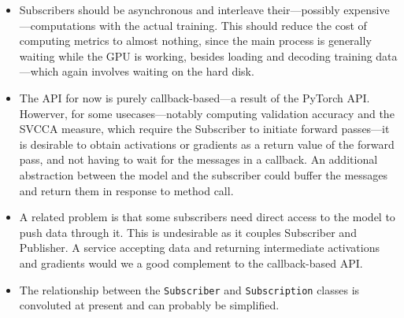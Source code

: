 \begin{itemize}
    \item Subscribers should be asynchronous and interleave their---possibly
        expensive---computations with the actual training. This should reduce
        the cost of computing metrics to almost nothing, since the main process
        is generally waiting while the GPU is working, besides loading and
        decoding training data---which again involves waiting on the hard disk.
    \item The API for now is purely callback-based---a result of the PyTorch
        API. Howerver, for some usecases---notably computing validation
        accuracy and the SVCCA measure, which require the Subscriber to initiate
        forward passes---it is desirable to obtain activations or gradients as
        a return value of the forward pass, and not having to wait for the
        messages in a callback. An additional abstraction between the model and
        the subscriber could buffer the messages and return them in response to
        method call.
    \item A related problem is that some subscribers need direct access to the
        model to push data through it. This is undesirable as it couples
        Subscriber and Publisher. A service accepting data and returning
        intermediate activations and gradients would we a good complement to the
        callback-based API.
    \item The relationship between the \texttt{Subscriber} and
        \texttt{Subscription} classes is convoluted at present and can probably
        be simplified.
\end{itemize}
